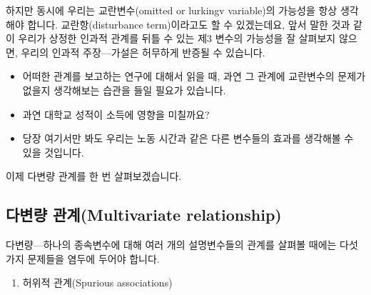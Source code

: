 \documentclass[]{book}
\providecommand{\tightlist}{%
  \setlength{\itemsep}{0pt}\setlength{\parskip}{0pt}}
\begin{document}
하지만 동시에 우리는 교란변수(omitted or lurkingv variable)의 가능성을 항상 생각해야 합니다. 교란항(disturbance term)이라고도 할 수 있겠는데요, 앞서 말한 것과 같이 우리가 상정한 인과적 관계를 뒤틀 수 있는 제3 변수의 가능성을 잘 살펴보지 않으면, 우리의 인과적 주장---가설은 허무하게 반증될 수 있습니다.

\begin{itemize}
\tightlist
\item
  어떠한 관계를 보고하는 연구에 대해서 읽을 때, 과연 그 관계에 교란변수의 문제가 없을지 생각해보는 습관을 들일 필요가 있습니다.
\item
  과연 대학교 성적이 소득에 영향을 미칠까요?
\item
  당장 여기서만 봐도 우리는 노동 시간과 같은 다른 변수들의 효과를 생각해볼 수 있을 것입니다.
\end{itemize}

이제 다변량 관계를 한 번 살펴보겠습니다.

\hypertarget{uxb2e4uxbcc0uxb7c9-uxad00uxacc4multivariate-relationship}{%
\subsection{다변량 관계(Multivariate relationship)}\label{uxb2e4uxbcc0uxb7c9-uxad00uxacc4multivariate-relationship}}

다변량---하나의 종속변수에 대해 여러 개의 설명변수들의 관계를 살펴볼 때에는 다섯 가지 문제들을 염두에 두어야 합니다.

\begin{enumerate}
\def\labelenumi{\arabic{enumi}.}
\tightlist
\item
  허위적 관계(Spurious associations)
\end{enumerate}
\end{document}
